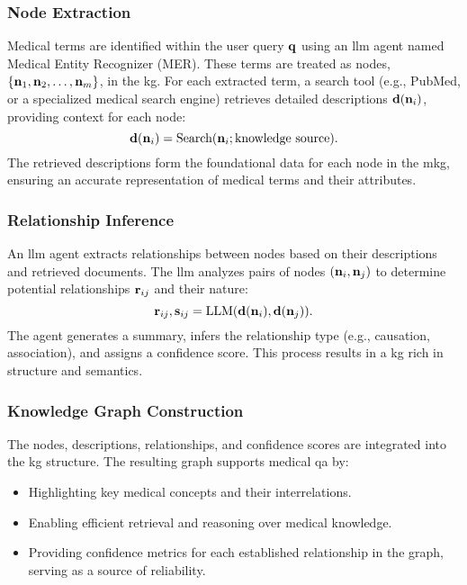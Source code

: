 \subsubsection{Node Extraction}
Medical terms are identified within the user query ${\mathbf{q}}$ using an \gls{llm} agent named Medical Entity Recognizer (MER). These terms are treated as nodes, $\{{\mathbf{n}}_1, {\mathbf{n}}_2, \ldots, {\mathbf{n}}_m\}$, in the \gls{kg}. For each extracted term, a search tool (e.g., PubMed, or a specialized medical search engine) retrieves detailed descriptions ${\mathbf{d}}({\mathbf{n}}_i)$, providing context for each node:
\[
{\mathbf{d}}({\mathbf{n}}_i) = \text{Search}({\mathbf{n}}_i; \text{knowledge source}).
\]
The retrieved descriptions form the foundational data for each node in the \gls{mkg}, ensuring an accurate representation of medical terms and their attributes.

\subsubsection{Relationship Inference}
An \gls{llm} agent extracts relationships between nodes based on their descriptions and retrieved documents. The \gls{llm} analyzes pairs of nodes $({\mathbf{n}}_i, {\mathbf{n}}_j)$ to determine potential relationships ${\mathbf{r}}_{ij}$ and their nature:
\[
{\mathbf{r}}_{ij}, {\mathbf{s}}_{ij} = \text{LLM}({\mathbf{d}}({\mathbf{n}}_i), {\mathbf{d}}({\mathbf{n}}_j)).
\]
The agent generates a summary, infers the relationship type (e.g., causation, association), and assigns a confidence score. This process results in a \gls{kg} rich in structure and semantics.

\subsubsection{Knowledge Graph Construction}
The nodes, descriptions, relationships, and confidence scores are integrated into the \gls{kg} structure. The resulting graph supports medical \gls{qa} by:
\begin{itemize}
    \item Highlighting key medical concepts and their interrelations.
    \item Enabling efficient retrieval and reasoning over medical knowledge.
    \item Providing confidence metrics for each established relationship in the graph, serving as a source of reliability.
\end{itemize}
